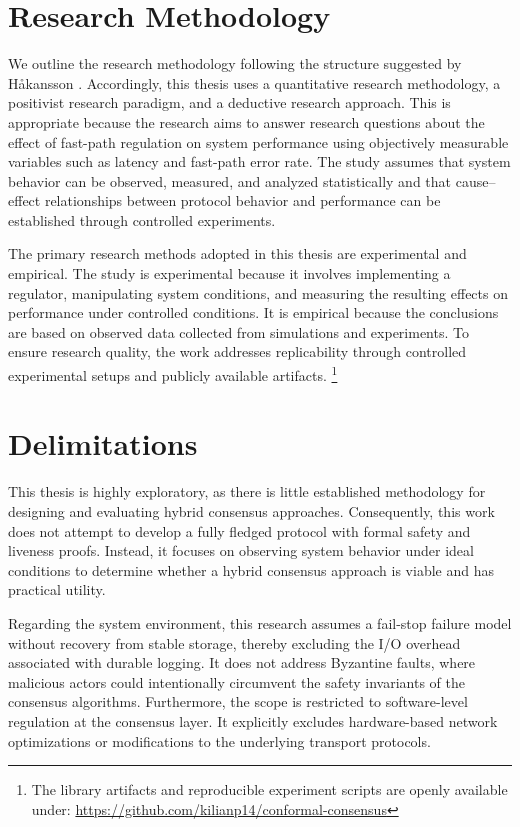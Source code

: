 \section{Research Methodology}
We outline the research methodology following the structure suggested by Håkansson \cite{Hakansson-ResearchMethods-2013}. Accordingly, this thesis uses a quantitative research methodology, a positivist research paradigm, and a deductive research approach. This is appropriate because the research aims to answer research questions about the effect of fast-path regulation on system performance using objectively measurable variables such as latency and fast-path error rate. The study assumes that system behavior can be observed, measured, and analyzed statistically and that cause–effect relationships between protocol behavior and performance can be established through controlled experiments.

The primary research methods adopted in this thesis are experimental and empirical. The study is experimental because it involves implementing a regulator, manipulating system conditions, and measuring the resulting effects on performance under controlled conditions. It is empirical because the conclusions are based on observed data collected from simulations and experiments. To ensure research quality, the work addresses replicability through controlled experimental setups and publicly available artifacts. \footnote{The library artifacts and reproducible experiment scripts are openly available under: \url{https://github.com/kilianp14/conformal-consensus}}

\section{Delimitations}
This thesis is highly exploratory, as there is little established methodology for designing and evaluating hybrid consensus approaches. Consequently, this work does not attempt to develop a fully fledged protocol with formal safety and liveness proofs. Instead, it focuses on observing system behavior under ideal conditions to determine whether a hybrid consensus approach is viable and has practical utility.

Regarding the system environment, this research assumes a fail-stop failure model without recovery from stable storage, thereby excluding the I/O overhead associated with durable logging. It does not address Byzantine faults, where malicious actors could intentionally circumvent the safety invariants of the consensus algorithms. Furthermore, the scope is restricted to software-level regulation at the consensus layer. It explicitly excludes hardware-based network optimizations or modifications to the underlying transport protocols.


